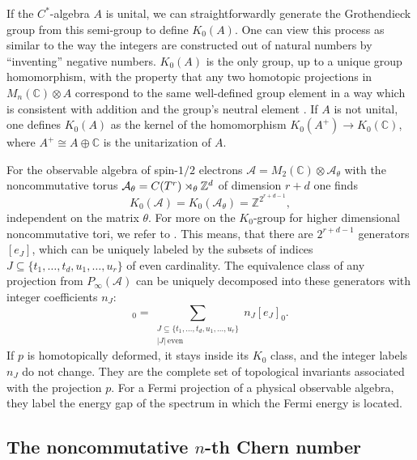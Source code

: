 \documentclass[submission, Phys]{SciPost}
\begin{document}
If the $C^\ast$-algebra $A$ is unital, we can straightforwardly generate the Grothendieck group from this semi-group to define $K_0(A)$.
One can view this process as similar to the way the integers are constructed out of natural numbers by ``inventing'' negative numbers.
$K_0(A)$ is the only group, up to a unique group homomorphism, with the property that 
any two homotopic projections in $M_n(\mathbb{C})\otimes A$ correspond to the same well-defined group element in a way which is consistent with addition and the group's neutral element \cite[Prop.~3.1.8]{Rordam2000}.
If $A$ is not unital, one defines $K_0(A)$ as the kernel of the homomorphism $K_0(A^+)\to K_0(\mathbb{C})$, where $ A^+\cong A\oplus \mathbb{C}$ is the unitarization of $A$.

For the observable algebra of spin-$1/2$ electrons $\mathcal{A}=M_2(\mathbb{C})\otimes\mathcal{A}_\theta$ with the noncommutative torus $\mathcal{A}_\theta=C(T^r)\rtimes_\theta \mathbb{Z}^d$ of dimension $r+d$ one finds \cite[Prop.~4.2.4]{Prodan2017}
\begin{equation}
    K_0(\mathcal{A})=K_0(\mathcal{A}_\theta)=\mathbb{Z}^{2^{r+d-1}},
\end{equation}
independent on the matrix $\theta$. For more on the $K_0$-group for higher dimensional noncommutative tori, we refer to \cite{Rieffel1988}. This means, that there are $2^{r+d-1}$ generators $[e_J]$, which can be uniquely labeled by the subsets of indices $J\subseteq\{t_1, \ldots, t_d, u_1, \ldots, u_r\}$ of even cardinality.
The equivalence class of any projection from $P_\infty(\mathcal{A})$ can be uniquely decomposed into these generators with integer coefficients $n_J$:
\begin{equation}
    [p]_0 = \sum_{\substack{J\subseteq\{t_1, \ldots, t_d, u_1, \ldots, u_r\}\\ |J|\ \text{even}}} n_J [e_J]_0.
\end{equation}
If $p$ is homotopically deformed, it stays inside its $K_0$ class, and the integer labels $n_J$ do not change.
They are the complete set of topological invariants associated with the projection $p$.
For a Fermi projection of a physical observable algebra, they label the energy gap of the spectrum in which the Fermi energy is located.

\subsection{The noncommutative \texorpdfstring{$n$}{n}-th Chern number}
\label{subsec:chern_numbers}
\end{document}
